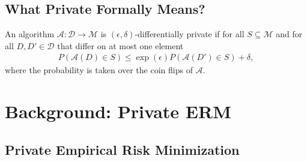 \documentclass{beamer}
\newcommand{\cA}{\mathcal{A}}
\newcommand{\cD}{\mathcal{D}}
\newcommand{\cM}{\mathcal{M}}
\begin{document}

\subsection{What Private \alert{Formally} Means?}

\begin{frame}

  \vspace{0.5em}

  \begin{definition}
    An algorithm $\cA: \cD \rightarrow \cM$ is
    \alert{$(\epsilon, \delta)$-differentially private} if for all
    $S \subseteq \cM$ and for all $D, D' \in \cD$ that \alert{differ on
      at most one element}
    \begin{align}
      P(\cA(D) \in S) \le \exp(\epsilon) P(\cA(D') \in S) + \delta,
    \end{align}
    where the probability is taken over the coin flips of $\cA$.
  \end{definition}




  \vspace{2em}

\end{frame}

\section{Background: Private ERM}

\subsection{Private Empirical Risk Minimization}
\end{document}
